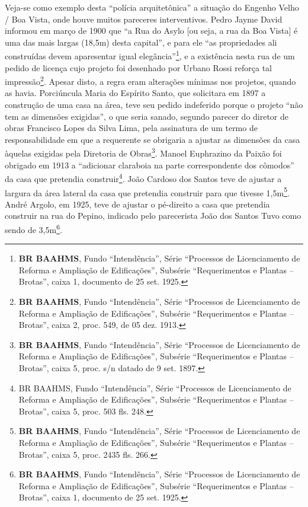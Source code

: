 Veja-se como exemplo desta ``polícia arquitetônica'' a situação do Engenho Velho / Boa Vista, onde houve muitos pareceres interventivos. Pedro Jayme David informou em março de 1900 que ``a Rua do Asylo [ou seja, a rua da Boa Vista] é uma das mais largas (18,5m) desta capital'', e para ele ``as propriedades ali construídas devem aparesentar igual elegância''\footnote{\textbf{BR BAAHMS}, Fundo ``Intendência'', Série ``Processos de Licenciamento de Reforma e Ampliação de Edificações'', Subsérie ``Requerimentos e Plantas – Brotas'', caixa 1, documento de 25 set. 1925.}, e a existência nesta rua de um pedido de licença cujo projeto foi desenhado por Urbano Rossi reforça tal impressão\footnote{\textbf{BR BAAHMS}, Fundo ``Intendência'', Série ``Processos de Licenciamento de Reforma e Ampliação de Edificações'', Subsérie ``Requerimentos e Plantas – Brotas'', caixa 2, proc. 549, de 05 dez. 1913.}. Apesar disto, a regra eram alterações mínimas nos projetos, quando as havia. Porciúncula Maria do Espírito Santo, que solicitara em 1897 a construção de uma casa na área, teve seu pedido indeferido porque o projeto ``não tem as dimensões exigidas'', o que seria sanado, segundo parecer do diretor de obras Francisco Lopes da Silva Lima, pela assinatura de um termo de responsabilidade em que a requerente se obrigaria a ajustar as dimensões da casa àquelas exigidas pela Diretoria de Obras\footnote{\textbf{BR BAAHMS}, Fundo ``Intendência'', Série ``Processos de Licenciamento de Reforma e Ampliação de Edificações'', Subsérie ``Requerimentos e Plantas – Brotas'', caixa 5, proc. s/n datado de 9 set. 1897.}. Manoel Euphrazino da Paixão foi obrigado em 1913 a ``adicionar claraboia na parte correspondente dos cômodos'' da casa que pretendia construir\footnote{BR BAAHMS, Fundo ``Intendência'', Série ``Processos de Licenciamento de Reforma e Ampliação de Edificações'', Subsérie ``Requerimentos e Plantas – Brotas'', caixa 5, proc. 503 fls. 248.}. João Cardoso dos Santos teve de ajustar a largura da área lateral da casa que pretendia construir para que tivesse 1,5m\footnote{\textbf{BR BAAHMS}, Fundo ``Intendência'', Série ``Processos de Licenciamento de Reforma e Ampliação de Edificações'', Subsérie ``Requerimentos e Plantas – Brotas'', caixa 5, proc. 2435 fls. 266.}. André Argolo, em 1925, teve de ajustar o pé-direito a casa que pretendia construir na rua do Pepino, indicado pelo parecerista João dos Santos Tuvo como sendo de 3,5m\footnote{\textbf{BR BAAHMS}, Fundo ``Intendência'', Série ``Processos de Licenciamento de Reforma e Ampliação de Edificações'', Subsérie ``Requerimentos e Plantas – Brotas'', caixa 1, documento de 25 set. 1925.}. 

